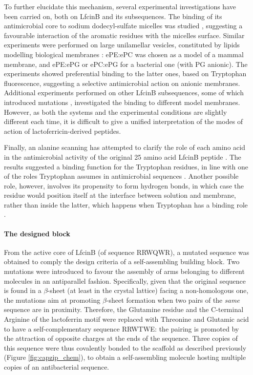 To further elucidate this mechanism, several experimental investigations have been carried on, both on LfcinB and its subsequences. The binding of its antimicrobial core to sodium dodecyl-sulfate micelles was studied \citep{Schibli1999}, suggesting a favourable interaction of the aromatic residues with the micelles surface.
%
Similar experiments were performed on large unilamellar vesicles, constituted by lipids modelling biological membranes \citep{Nguyen2005}: ePE:ePC was chosen as a model of a mammal membrane, and ePE:ePG or ePC:ePG for a bacterial one (with PG anionic). The experiments showed preferential binding to the latter ones, based on Tryptophan fluorescence, suggesting a selective antimicrobial action on anionic membranes.
%
Additional experiments performed on other LfcinB subsequences, some of which introduced mutations \citep{Tsutsumi2012,Arseneault2010}, investigated the binding to different model membranes. However, as both the systems and the experimental conditions are slightly different each time, it is difficult to give a unified interpretation of the modes of action of lactoferricin-derived peptides.

Finally, an alanine scanning has attempted to clarify the role of each amino acid in the antimicrobial activity of the original 25 amino acid LfcinB peptide \citep{Strom2002}. The results suggested a binding function for the Tryptophan residues, in line with one of the roles Tryptophan assumes in antimicrobial sequences \citep{Chan2006}.
%
Another possible role, however, involves its propensity to form hydrogen bonds, in which case the residue would position itself at the interface between solution and membrane, rather than inside the latter, which happens when Tryptophan has a binding role \citep{Chan2006}.

\paragraph{The designed block}
From the active core of LfcinB (of sequence RRWQWR), a mutated sequence was obtained to comply the design criteria of a self-assembling building block. Two mutations were introduced to favour the assembly of arms belonging to different molecules in an antiparallel fashion. Specifically, given that the original sequence is found in a $\beta$-sheet (at least in the crystal lattice) facing a non-homologous one, the mutations aim at promoting  $\beta$-sheet formation when two pairs of the \emph{same} sequence are in proximity. Therefore, the Glutamine residue and the C-terminal Arginine of the lactoferrin motif were replaced with Threonine and Glutamic acid to have a self-complementary sequence RRWTWE: the pairing is promoted by the attraction of opposite charges at the ends of the sequence.
%
Three copies of this sequence were thus covalently bonded to the scaffold as described previously (Figure \ref{fig:capzip_chem}), to obtain a self-assembling molecule hosting multiple copies of an antibacterial sequence.

